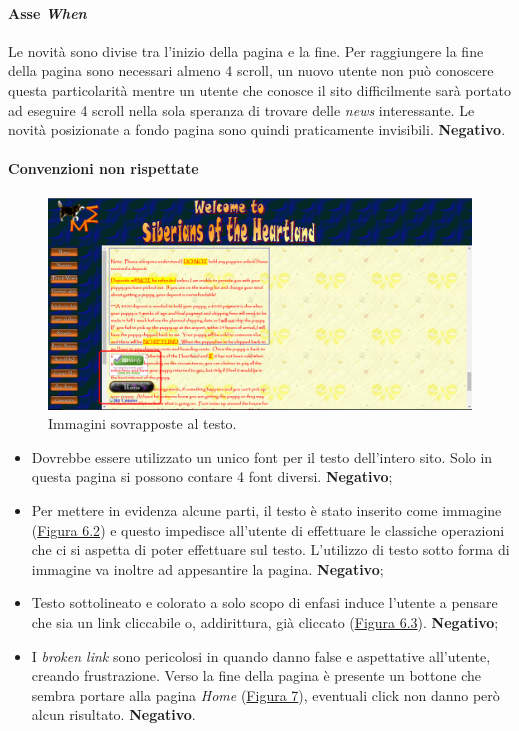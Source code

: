 \documentclass[../rapporto-usabilita.tex]{subfiles}
\begin{document}
		\paragraph{Asse \textit{When}}
			Le novità sono divise tra l'inizio della pagina e la fine. Per raggiungere la fine della pagina sono necessari almeno 4 scroll, un nuovo utente non può conoscere questa particolarità mentre un utente che conosce il sito difficilmente sarà portato ad eseguire 4 scroll nella sola speranza di trovare delle \textit{news} interessante. Le novità posizionate a fondo pagina sono quindi praticamente invisibili. \textbf{Negativo}.
		
		\paragraph{Convenzioni non rispettate}
		
		\begin{figure}[!h]
			\centering
				\includegraphics[scale=0.33]{immagini/part_nursery4.jpg}
				\caption{Immagini sovrapposte al testo.}
				\label{fig:nursery4}
			\end{figure}	
		
		\begin{itemize}
	 		\item Dovrebbe essere utilizzato un unico font per il testo dell'intero sito. Solo in questa pagina si possono contare 4 font diversi. \textbf{Negativo};
	 		
	 		\item Per mettere in evidenza alcune parti, il testo è stato inserito come immagine (\hyperref[fig:nursery1]{Figura 6.2}) e questo impedisce all'utente di effettuare le classiche operazioni che ci si aspetta di poter effettuare sul testo. L'utilizzo di testo sotto forma di immagine va inoltre ad appesantire la pagina. \textbf{Negativo};
	 		
	 		\item Testo sottolineato e colorato a solo scopo di enfasi induce l'utente a pensare che sia un link cliccabile o, addirittura, già cliccato (\hyperref[fig:nursery1]{Figura 6.3}). \textbf{Negativo};
	 		
	 		\item I \textit{broken link} sono pericolosi in quando danno false e aspettative all'utente, creando frustrazione. Verso la fine della pagina è presente un bottone che sembra portare alla pagina \textit{Home} (\hyperref[fig:nursery4]{Figura 7}), eventuali click non danno però alcun risultato. \textbf{Negativo}.

	 	\end{itemize}
	 	
\end{document}
